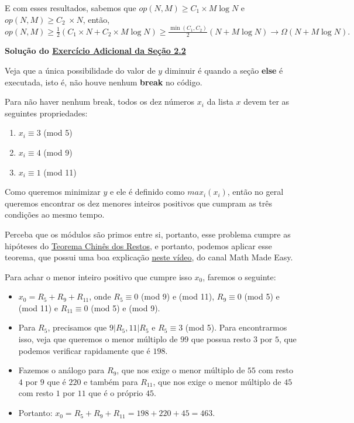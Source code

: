 \documentclass[11pt, a4paper]{article}
\begin{document}
    E com esses resultados, sabemos que \(op(N,M) \geq C_1\times M \log N\) e \(op(N,M) \geq C_2\ \times N\), então, \(op(N,M)\geq \frac{1}{2}(C_1\times N + C_2 \times M \log N)\geq \frac{\min(C_1,C_2)}{2}(N+M \log N) \rightarrow \Omega(N+M \log N).\)

\newpage

\label{sol_c2.2.6}
\textbf{Solução do \hyperref[c2.2.6]{Exercício Adicional da Seção 2.2}}

Veja que a única possibilidade do valor de \(y\) diminuir é quando a seção \textbf{else} é executada, isto é, não houve nenhum \textbf{break} no código.

Para não haver nenhum break, todos os dez números \(x_i\) da lista \(x\) devem ter as seguintes propriedades:

\begin{enumerate}
    \item \(x_i \equiv 3\) (mod 5)
    \item \(x_i \equiv 4\) (mod 9)
    \item \(x_i \equiv 1\) (mod 11)
\end{enumerate}

Como queremos minimizar \(y\) e ele é definido como \(max_{i}(x_i)\), então no geral queremos encontrar os dez menores inteiros positivos que cumpram as três condições ao mesmo tempo.

Perceba que os módulos são primos entre si, portanto, esse problema cumpre as hipóteses do \href{https://en.wikipedia.org/wiki/Chinese_remainder_theorem}{Teorema Chinês dos Restos}, e portanto, podemos aplicar esse teorema, que possui uma boa explicação \href{https://www.youtube.com/watch?v=ru7mWZJlRQg}{neste vídeo}, do canal Math Made Easy.

Para achar o menor inteiro positivo que cumpre isso \(x_0\), faremos o seguinte:
\begin{itemize}
    \item \(x_0 = R_5 +R_9 + R_{11}\), onde \(R_5 \equiv 0\) (mod 9) e (mod 11), \(R_9 \equiv 0\) (mod 5) e (mod 11) e \(R_{11} \equiv 0\) (mod 5) e (mod 9).

    \item Para \(R_5\), precisamos que \(9 | R_5, 11 |R_5\) e \(R_5 \equiv 3\) (mod 5). Para encontrarmos isso, veja que queremos o menor múltiplo de \(99\) que possua resto \(3\) por \(5\), que podemos verificar rapidamente que é \(198\).

    \item Fazemos o análogo para \(R_{9}\), que nos exige o menor múltiplo de \(55\) com resto \(4\) por \(9\) que é \(220\) e também para \(R_{11}\), que nos exige o menor múltiplo de \(45\) com resto \(1\) por \(11\) que é o próprio \(45\).

    \item Portanto: \(x_0 = R_5+R_9+R_{11}=198+220+45=463\).
\end{itemize}
\end{document}
